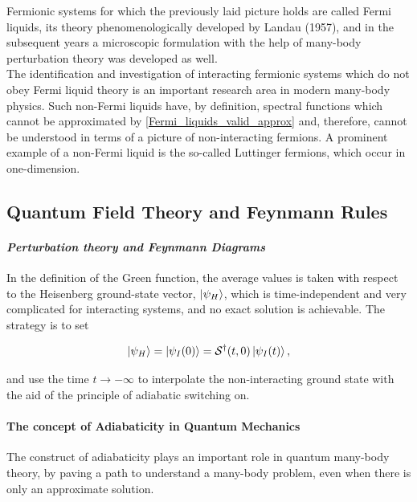 \begin{tcolorbox}[colback=yellow, 
title = Physical Context]

Fermionic systems for which the previously laid picture holds are called Fermi liquids, its theory phenomenologically developed by Landau (1957), and in the subsequent years a microscopic formulation with the help of many-body perturbation theory was developed as well. \\

The identification and investigation of interacting fermionic systems which do not obey Fermi liquid theory is an important research area in modern many-body physics. Such non-Fermi liquids have, by definition, spectral functions which cannot be approximated by \cref{Fermi_liquids_valid_approx} and, therefore, cannot be understood in terms of a picture of non-interacting fermions. A prominent example of a non-Fermi liquid is the so-called Luttinger fermions, which occur in one-dimension.  
\end{tcolorbox}

\subsection{\textbf{Quantum Field Theory and Feynmann Rules}}

\paragraph{\textit{Perturbation theory and Feynmann Diagrams}}

In the definition of the Green function, the average values is taken with respect to the Heisenberg ground-state vector, $\ket{\psi_H}$, which is time-independent and very complicated for interacting systems, and no exact solution is achievable. The strategy is to set 

$$
    \ket{\psi_H} = \ket{\psi_I (0)} = \mathcal{S}^\dagger(t,0) \ket{\psi_I (t)},
$$

and use the time $t \rightarrow -\infty$ to interpolate the non-interacting ground state with the aid of the principle of adiabatic switching on. \\

\paragraph{The concept of Adiabaticity in Quantum Mechanics} 

The construct of adiabaticity plays an important role in quantum many-body theory, by paving a path to understand a many-body problem, even when there is only an approximate solution. \\

